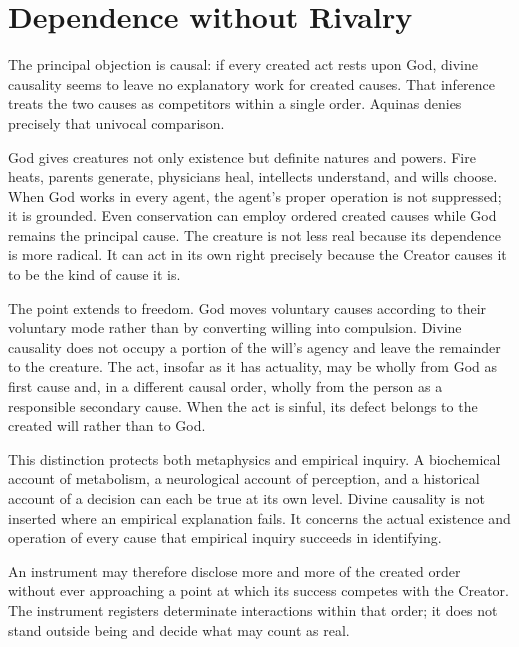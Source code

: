 \section{Dependence without Rivalry}

The principal objection is causal: if every created act rests upon God, divine causality seems to leave no explanatory work for created causes. That inference treats the two causes as competitors within a single order. Aquinas denies precisely that univocal comparison.

God gives creatures not only existence but definite natures and powers. Fire heats, parents generate, physicians heal, intellects understand, and wills choose. When God works in every agent, the agent's proper operation is not suppressed; it is grounded. Even conservation can employ ordered created causes while God remains the principal cause. The creature is not less real because its dependence is more radical. It can act in its own right precisely because the Creator causes it to be the kind of cause it is.

The point extends to freedom. God moves voluntary causes according to their voluntary mode rather than by converting willing into compulsion. Divine causality does not occupy a portion of the will's agency and leave the remainder to the creature. The act, insofar as it has actuality, may be wholly from God as first cause and, in a different causal order, wholly from the person as a responsible secondary cause. When the act is sinful, its defect belongs to the created will rather than to God.

This distinction protects both metaphysics and empirical inquiry. A biochemical account of metabolism, a neurological account of perception, and a historical account of a decision can each be true at its own level. Divine causality is not inserted where an empirical explanation fails. It concerns the actual existence and operation of every cause that empirical inquiry succeeds in identifying.

An instrument may therefore disclose more and more of the created order without ever approaching a point at which its success competes with the Creator. The instrument registers determinate interactions within that order; it does not stand outside being and decide what may count as real.


